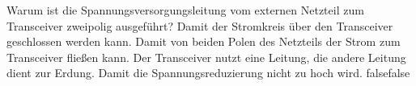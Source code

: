     {Warum ist die Spannungsversorgungsleitung vom externen Netzteil zum Transceiver zweipolig ausgeführt?}
    {Damit der Stromkreis über den Transceiver geschlossen werden kann.}
    {Damit von beiden Polen des Netzteils der Strom zum Transceiver fließen kann.}
    {Der Transceiver nutzt eine Leitung, die andere Leitung dient zur Erdung.
}
    {Damit die Spannungsreduzierung nicht zu hoch wird.}
    {false}{false}